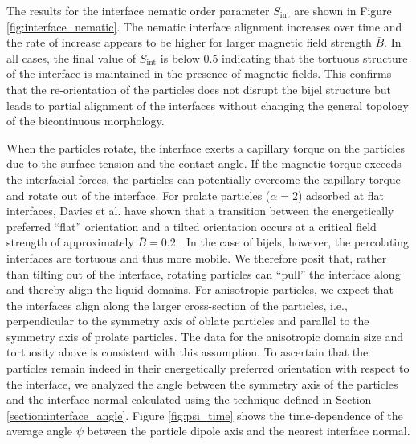 The results for the interface nematic order parameter $S_{\text{int}}$
are shown in Figure \ref{fig:interface_nematic}. The nematic interface
alignment increases over time and the rate of increase appears to be
higher for larger magnetic field strength $\bar{B}$. In all cases, the
final value of $S_{\text{int}}$ is below 0.5 indicating that the
tortuous structure of the interface is maintained in the presence of
magnetic fields. This confirms that the re-orientation of the particles
does not disrupt the bijel structure but leads to partial alignment of
the interfaces without changing the general topology of the bicontinuous
morphology.

When the particles rotate, the interface exerts a capillary torque on
the particles due to the surface tension and the contact angle. If the
magnetic torque exceeds the interfacial forces, the particles can
potentially overcome the capillary torque and rotate out of the
interface. For prolate particles (\(\alpha=2\)) adsorbed at flat
interfaces, Davies et al. have shown that a transition between the
energetically preferred ``flat'' orientation and a tilted orientation
occurs at a critical field strength of approximately \(\bar{B}=0.2\)
\cite{bresme_orientational_2007,davies_interface_2014,newton_influence_2014}.
In the case of bijels, however, the percolating interfaces are tortuous
and thus more mobile. We therefore posit that, rather than tilting out
of the interface, rotating particles can ``pull'' the interface along
and thereby align the liquid domains. For anisotropic particles, we
expect that the interfaces align along the larger cross-section of the
particles, i.e., perpendicular to the symmetry axis of oblate particles
and parallel to the symmetry axis of prolate particles. The data for the
anisotropic domain size and tortuosity above is consistent with this
assumption. To ascertain that the particles remain indeed in their
energetically preferred orientation with respect to the interface, we
analyzed the angle between the symmetry axis of the particles and the
interface normal calculated using the technique defined in Section 
\ref{section:interface_angle}. Figure \ref{fig:psi_time} shows the time-dependence of the average angle
\(\psi\) between the particle dipole axis and the nearest interface normal.

